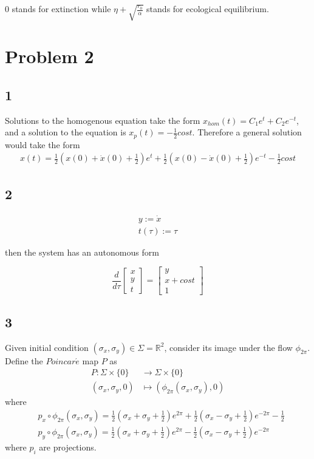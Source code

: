 \documentclass{article}
\begin{document}
$0$ stands for extinction while $\eta+\sqrt{\frac{r_0}{\alpha}}$  stands for ecological equilibrium.


\section*{Problem 2}



\subsection*{1}
Solutions to the homogenous equation take the form $x_{hom}(t)=C_1e^t+C_2e^{-t}$, and a solution to the equation is $x_p(t)=-\frac{1}{2}cost$. Therefore a general solution would take the form
\begin{align*}
	x(t)=\frac{1}{2}(x(0)+\dot{x}(0)+\frac{1}{2})e^t+ \frac{1}{2}(x(0)-\dot{x}(0)+\frac{1}{2}) e^{-t}-\frac{1}{2}cost
\end{align*}



\subsection*{2}
\begin{align*}
	y:=\dot{x} \\
	t(\tau):=\tau 
\end{align*}

then the system has an autonomous form 

	
	\begin{equation*}
	\frac{d}{d\tau}\left[
	\begin{array}{c}
		 x\\
		 y\\
		 t
	\end{array}
	\right]=
	\left[
	\begin{array}{c}
		 y\\
		 x+cost\\
		 1
	\end{array}
	\right]
\end{equation*}



\subsection*{3}
Given initial condition $(\sigma_x,\sigma_y)\in \Sigma=\mathbb{R}^2$, consider its image under the flow $\phi_{2\pi}$. Define the $Poincar\acute{e}$ map $P$ as 
\begin{align*}
	P:\Sigma\times\{0\}&\rightarrow\Sigma\times\{0\} \\
	(\sigma_x,\sigma_y,0)&\mapsto (\phi_{2\pi}(\sigma_x,\sigma_y),0)
\end{align*}
where
\begin{align*}
	&p_x\circ\phi_{2\pi}(\sigma_x,\sigma_y)=\frac{1}{2}(\sigma_x+\sigma_y+\frac{1}{2})e^{2\pi}+ \frac{1}{2}(\sigma_x-\sigma_y+\frac{1}{2}) e^{-2\pi}-\frac{1}{2} \\
	&p_y\circ\phi_{2\pi}(\sigma_x,\sigma_y)=\frac{1}{2}(\sigma_x+\sigma_y+\frac{1}{2})e^{2\pi}- \frac{1}{2}(\sigma_x-\sigma_y+\frac{1}{2}) e^{-2\pi}
\end{align*}
where $p_i$ are projections.
\end{document}
